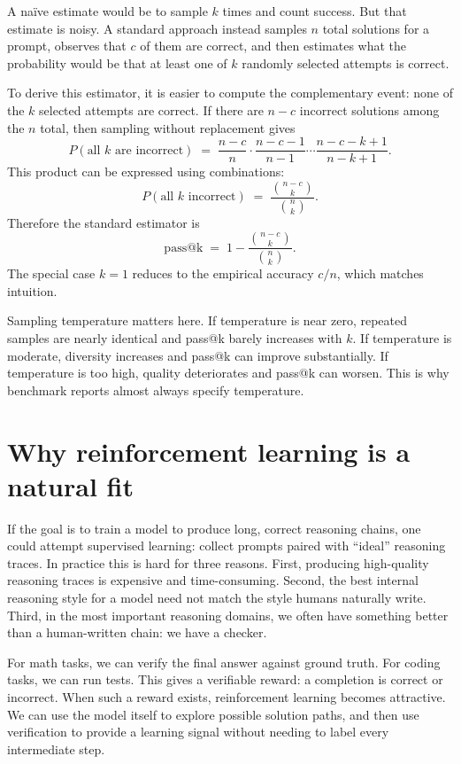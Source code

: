 A naïve estimate would be to sample \(k\) times and count success. But that estimate is noisy. A standard approach instead samples \(n\) total solutions for a prompt, observes that \(c\) of them are correct, and then estimates what the probability would be that at least one of \(k\) randomly selected attempts is correct.

To derive this estimator, it is easier to compute the complementary event: none of the \(k\) selected attempts are correct. If there are \(n-c\) incorrect solutions among the \(n\) total, then sampling without replacement gives
\[
P(\text{all } k \text{ are incorrect}) \;=\; \frac{n-c}{n}\cdot \frac{n-c-1}{n-1}\cdots \frac{n-c-k+1}{n-k+1}.
\]
This product can be expressed using combinations:
\[
P(\text{all } k \text{ incorrect}) \;=\; \frac{\binom{n-c}{k}}{\binom{n}{k}}.
\]
Therefore the standard estimator is
\[
\mathrm{pass@k} \;=\; 1 - \frac{\binom{n-c}{k}}{\binom{n}{k}}.
\]
The special case \(k=1\) reduces to the empirical accuracy \(c/n\), which matches intuition.

Sampling temperature matters here. If temperature is near zero, repeated samples are nearly identical and pass@k barely increases with \(k\). If temperature is moderate, diversity increases and pass@k can improve substantially. If temperature is too high, quality deteriorates and pass@k can worsen. This is why benchmark reports almost always specify temperature.

\section{Why reinforcement learning is a natural fit}
If the goal is to train a model to produce long, correct reasoning chains, one could attempt supervised learning: collect prompts paired with “ideal” reasoning traces. In practice this is hard for three reasons. First, producing high-quality reasoning traces is expensive and time-consuming. Second, the best internal reasoning style for a model need not match the style humans naturally write. Third, in the most important reasoning domains, we often have something better than a human-written chain: we have a checker.

For math tasks, we can verify the final answer against ground truth. For coding tasks, we can run tests. This gives a verifiable reward: a completion is correct or incorrect. When such a reward exists, reinforcement learning becomes attractive. We can use the model itself to explore possible solution paths, and then use verification to provide a learning signal without needing to label every intermediate step.

